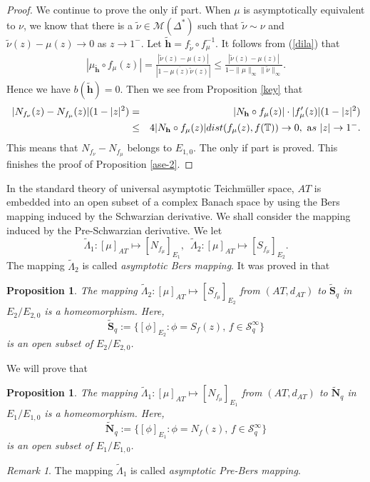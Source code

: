 \documentclass[11pt]{amsart}
\newtheorem{proposition}[theorem]{Proposition}
\theoremstyle{remark}
\newtheorem{remark}[theorem]{Remark}
\theoremstyle{claim}
\theoremstyle{definition}
\theoremstyle{problem}
\theoremstyle{conjecture}
\theoremstyle{question}
\numberwithin{equation}{section}
\begin{document}
\begin{proof}
We continue to prove the only if part. When $\mu$ is  asymptotically equivalent to $\nu$,  we know that there is a $\widetilde{\nu}\in \mathcal{M}(\Delta^{*})$ such that $\widetilde{\nu}\sim \nu$ and $\widetilde{\nu}(z)-\mu(z) \rightarrow 0$ as $z \rightarrow 1^{-}$.
Let $\widetilde{\mathbf{h}}=f_{\widetilde{\nu}}\circ f_{\mu}^{-1}$.  It follows from (\ref{dila}) that
\begin{eqnarray}
|\mu_{\widetilde{\mathbf{h}}}\circ f_{{\mu}}(z)|=\frac{|\widetilde{\nu}(z)-{\mu}(z)|}{|1-\overline{\mu(z)}\widetilde{\nu}(z)|} \leq \frac{|\widetilde{\nu}(z)-{\mu}(z)|}{1-\|\mu\|_{\infty}\|\widetilde{\nu}\|_{\infty}}. \nonumber
\end{eqnarray}
Hence we have $b(\widetilde{\mathbf{h}})=0$.  Then we see from Proposition \ref{key} that
\begin{eqnarray}
|N_{f_{\nu}}(z)-N_{f_{\mu}}(z)|(1-|z|^2)&=&|N_{\mathbf{h}}\circ f_{\mu}(z)|\cdot |f'_{\mu}(z)|(1-|z|^2) \nonumber \\
& \leq &  4 |N_{\mathbf{h}}\circ f_{\mu}(z)|{\textup{dist}}(f_{\mu}(z), f(\mathbb{T})) \rightarrow 0, \,\, {\text as}\,\, |z| \rightarrow 1^{-}.\nonumber
\end{eqnarray}
This means that $N_{f_{\nu}}-N_{f_{\mu}}$ belongs to $E_{1,0}$. The only if part is proved. This finishes the proof of Proposition \ref{ase-2}.
\end{proof}

In the standard theory of universal asymptotic Teichm\"uller space, $AT$ is embedded into an open subset of a complex Banach space by using the Bers mapping induced by the Schwarzian derivative. We shall consider the mapping induced by the Pre-Schwarzian derivative.
We let
$$\widetilde{\Lambda}_1: [\mu]_{AT}  \mapsto  [N_{f_{\mu}}]_{E_1}, \,\,\,  \widetilde{\Lambda}_2: [\mu]_{AT}  \mapsto  [S_{f_{\mu}}]_{E_2}.$$
The mapping $\widetilde{\Lambda}_2$ is called {\em asymptotic Bers mapping}.  It was proved in \cite{EMS} that
\begin{proposition}\label{abers-1}
The mapping $\widetilde{\Lambda}_2: [\mu]_{AT}  \mapsto  [S_{f_{\mu}}]_{E_2}$ from $(AT, d_{AT})$ to $\widetilde{\mathbf{S}}_q$ in $E_2/E_{2,0}$ is a homeomorphism.
Here, $$\widetilde{\mathbf{S}}_q:=\{[\phi]_{E_2}: \phi=S_f(z),\, f\in \mathcal{S}_q^{\infty}\}$$
is an open subset of $E_2/E_{2,0}$.
\end{proposition}

We will prove that
\begin{proposition}\label{abers-2}
The mapping $\widetilde{\Lambda}_1: [\mu]_{AT}  \mapsto  [N_{f_{\mu}}]_{E_1}$ from  $(AT, d_{AT})$ to $\widetilde{\mathbf{N}}_q$ in $E_1/E_{1,0}$ is a homeomorphism.
Here, $$\widetilde{\mathbf{N}}_q:=\{[\phi]_{E_1}: \phi=N_f(z),\, f\in \mathcal{S}_q^{\infty}\}$$
is an open subset of $E_1/E_{1,0}$.
\end{proposition}
\begin{remark}
The mapping $\widetilde{\Lambda}_1$ is called {\em asymptotic Pre-Bers mapping}.
\end{remark}
\end{document}
